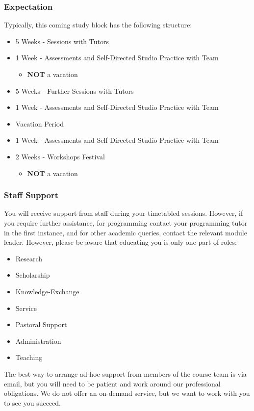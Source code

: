 \begin{frame}
	\frametitle{Expectation}
	
	Typically, this coming study block has the following structure:
	
	\begin{itemize}
		\item 5 Weeks - Sessions with Tutors
		\item 1 Week - Assessments and Self-Directed Studio Practice with Team
		\begin{itemize}
			\item \textbf{NOT} a vacation
		\end{itemize}
		\item 5 Weeks - Further Sessions with Tutors
		\item 1 Week - Assessments and Self-Directed Studio Practice with Team
		\item Vacation Period
		\item 1 Week - Assessments  and Self-Directed Studio Practice with Team
		\item 2 Weeks - Workshops Festival
		\begin{itemize}
			\item \textbf{NOT} a vacation
		\end{itemize}
	\end{itemize}
	
\end{frame}


\begin{frame}
	\frametitle{Staff Support}
	
	You will receive support from staff during your timetabled sessions. However, if you require further assistance, for programming contact your programming tutor in the first instance, and for other academic queries, contact the relevant module leader. However, please be aware that educating you is only one part of roles: 
	
	\begin{itemize}
		\item Research
		\item Scholarship
		\item Knowledge-Exchange
		\item Service
		\item Pastoral Support
		\item Administration
		\item Teaching
	\end{itemize}	
	
	The best way to arrange ad-hoc support from members of the course team is via email, but you will need to be patient and work around our professional obligations. We do not offer an on-demand service, but we want to work with you to see you succeed.
	
\end{frame}


